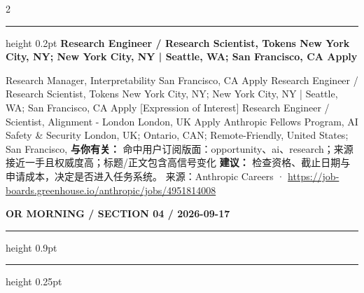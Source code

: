 \documentclass[10.5pt]{ctexart}
\begin{document}
\begin{multicols}{2}
\vspace{2mm}
\hrule height 0.2pt
\vspace{2mm}
{\large\bfseries Research Engineer / Research Scientist, Tokens New York City, NY; New York City, NY | Seattle, WA; San Francisco, CA Apply}\par
[Expression of Interest] Research Manager, Interpretability San Francisco, CA Apply Research Engineer / Research Scientist, Tokens New York City, NY; New York City, NY | Seattle, WA; San Francisco, CA Apply [Expression of Interest] Research Engineer / Scientist, Alignment - London London, UK Apply Anthropic Fellows Program, AI Safety \& Security London, UK; Ontario, CAN; Remote-Friendly, United States; San Francisco, 
\textbf{与你有关：} 命中用户订阅版面：opportunity、ai、research；来源接近一手且权威度高；标题/正文包含高信号变化
\textbf{建议：} 检查资格、截止日期与申请成本，决定是否进入任务系统。
{\footnotesize\color{ormuted} 来源：Anthropic Careers · \url{https://job-boards.greenhouse.io/anthropic/jobs/4951814008}}
\end{multicols}
\newpage
{\small\bfseries OR MORNING / SECTION 04 / 2026-09-17}
\vspace{2mm}
\hrule height 0.9pt
\vspace{1.5mm}
\hrule height 0.25pt
\vspace{4mm}
\end{document}
